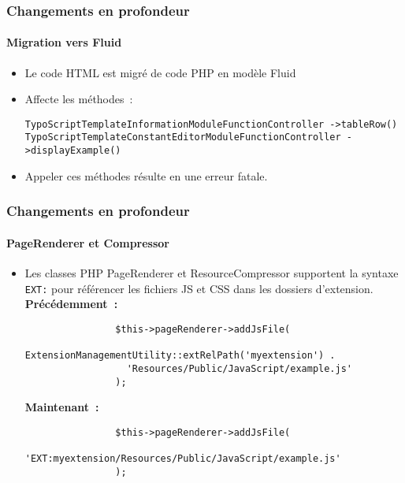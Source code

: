 \begin{frame}[fragile]
	\frametitle{Changements en profondeur}
	\framesubtitle{Migration vers Fluid}

	\begin{itemize}
		\item Le code HTML est migré de code PHP en modèle Fluid
		\item Affecte les méthodes~:\newline

			\smaller\texttt{TypoScriptTemplateInformationModuleFunctionController\newline
				->tableRow()}\normalsize\newline
			\smaller\texttt{TypoScriptTemplateConstantEditorModuleFunctionController\newline
				->displayExample()}\normalsize

		\item Appeler ces méthodes résulte en une erreur fatale.

	\end{itemize}

\end{frame}


\begin{frame}[fragile]
	\frametitle{Changements en profondeur}
	\framesubtitle{PageRenderer et Compressor}

	\lstset{basicstyle=\smaller\ttfamily}

	\begin{itemize}

		\item Les classes PHP PageRenderer et ResourceCompressor supportent la syntaxe
			\texttt{EXT:} pour référencer les fichiers JS et CSS dans les dossiers
			d'extension.\newline
			\textbf{Précédemment~:}

			\begin{lstlisting}
				$this->pageRenderer->addJsFile(
				  ExtensionManagementUtility::extRelPath('myextension') .
				  'Resources/Public/JavaScript/example.js'
				);
			\end{lstlisting}

			\textbf{Maintenant~:}

			\begin{lstlisting}
				$this->pageRenderer->addJsFile(
				  'EXT:myextension/Resources/Public/JavaScript/example.js'
				);
			\end{lstlisting}

	\end{itemize}

\end{frame}

